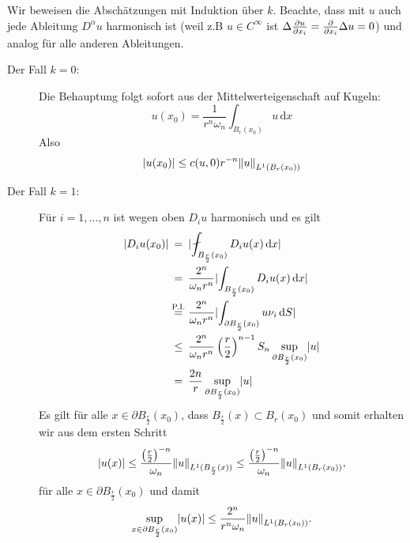 \begin{beweis}
	Wir beweisen die Abschätzungen mit Induktion über $k$. 
	Beachte, dass mit $u$ auch jede Ableitung $D^{\alpha}u$ harmonisch ist (weil z.B $u \in C^{\infty}$ ist $\Delta \frac{{\partial u}}{{\partial x_i}} = \frac{{\partial }}{{\partial x_i}} \Delta u = 0$) 
	und analog für alle anderen Ableitungen.
	\begin{description}
		\item[Der Fall $k=0$:] Die Behauptung folgt sofort aus der Mittelwerteigenschaft auf Kugeln:
		\begin{equation}
			u(x_0) = \frac{1}{r^n \omega_n} \int_{B_r(x_0)}^{}u \,\mathrm{d}x
		\end{equation} 
		Also 
		\begin{equation}
			\abs{u(x_0)} \leq c(u,0)r^{-n} \norm{u}_{L^1(B_r(x_0))}
		\end{equation}
		\item[Der Fall $k=1$:] Für $i=1,\dots,n$ ist wegen oben $D_iu$ harmonisch und es gilt
		\begin{align*}
			\abs{D_i u(x_0)} & \stackrel{\hphantom{\text{P.I.}}}{=} \abs{ \fint_{B_{\frac{r}{2}}(x_0)}^{} D_iu(x) \,\mathrm{d}x} \\
			& \stackrel{\hphantom{\text{P.I.}}}{=} \frac{2^n}{\omega_n r^n} \abs{\int_{B_{\frac{r}{2}}(x_0)}^{}D_i u(x) \,\mathrm{d}x} \\
			& \stackrel{\text{P.I.}}{=}  \frac{2^n}{\omega_n r^n} \abs{\int_{ \partial B_{\frac{r}{2}}(x_0)}^{} u \nu_i\,\mathrm{d}S} \\
			& \stackrel{\hphantom{\text{P.I.}}}{\leq} \frac{2^n}{\omega_n r^n} \left( \frac{r}{2} \right)^{n-1}S_n \sup_{\partial B_{\frac{r}{2}}(x_0)}\abs{u} \\
			& \stackrel{\hphantom{\text{P.I.}}}{=} \frac{2n}{r} \sup_{\partial B_{\frac{r}{2}}(x_0)}\abs{u}
		\end{align*}
		Es gilt für alle $x \in \partial B_{\frac{r}{2}}(x_0)$, dass $B_{\frac{r}{2}}(x) \subset B_r(x_0)$ und somit erhalten wir aus dem ersten Schritt
		\begin{equation}
			\abs{u(x)} \leq \frac{\left( \frac{r}{2} \right)^{-n}}{\omega_n} \norm{u}_{L^1(B_{\frac{r}{2}}(x))} 
			\leq \frac{\left( \frac{r}{2} \right)^{-n}}{\omega_n} \norm{u}_{L^1(B_r(x_0))},
		\end{equation}
		für alle $x \in \partial B_{\frac{r}{2}}(x_0)$ und damit
		\begin{equation}
			\sup_{x \in \partial B_{\frac{r}{2}}(x_0)}\abs{u(x)} \leq \frac{2^n}{r^n \omega_n} \norm{u}_{L^1(B_r(x_0))}.
		\end{equation}

\end{description}
\end{beweis}

